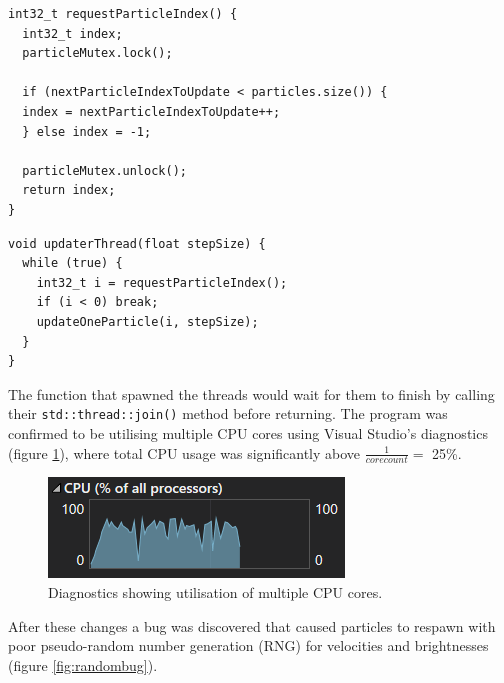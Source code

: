 \documentclass[11pt, a4paper, twocolumn]{article}
\begin{document}
\begin{verbatim}
int32_t requestParticleIndex() {
  int32_t index;
  particleMutex.lock();
  
  if (nextParticleIndexToUpdate < particles.size()) {
  index = nextParticleIndexToUpdate++;
  } else index = -1;
  
  particleMutex.unlock();
  return index;
}
\end{verbatim}
\begin{verbatim}
void updaterThread(float stepSize) {
  while (true) {
    int32_t i = requestParticleIndex();
    if (i < 0) break;
    updateOneParticle(i, stepSize);
  }
}
\end{verbatim}

The function that spawned the threads would wait for them to finish by calling their \verb|std::thread::join()| method before returning. The program was confirmed to be utilising multiple CPU cores using Visual Studio's diagnostics (figure \ref{fig:multithread-diagnostics}), where total CPU usage was significantly above $\frac{1}{core count}=$ 25\%.

\begin{figure}[h]
\includegraphics[width=\linewidth]{multithread-diagnostics}
\caption{Diagnostics showing utilisation of multiple CPU cores.}
\label{fig:multithread-diagnostics}
\end{figure}

After these changes a bug was discovered that caused particles to respawn with poor pseudo-random number generation (RNG) for velocities and brightnesses (figure \ref{fig:randombug}).
\end{document}

